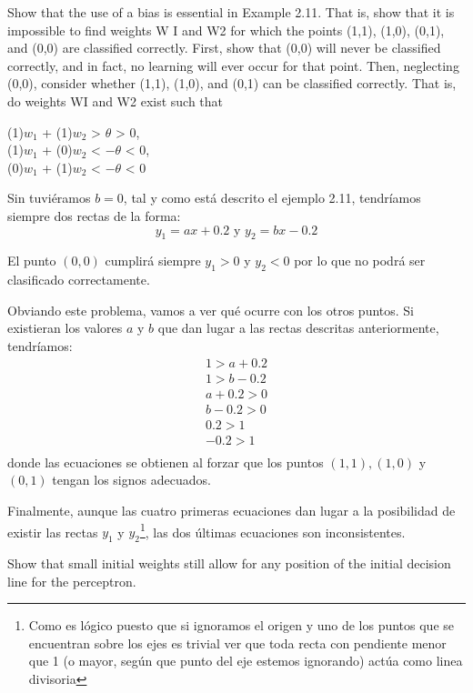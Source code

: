 \begin{problem}[9]
 Show that the use of a bias is essential in Example 2.11. That is, show that it is
impossible to find weights W I and W2 for which the points (1,1), (1,0), (0,1), and (0,0)
are classified correctly. First, show that (0,0) will never be classified correctly, and
in fact, no learning will ever occur for that point. Then, neglecting (0,0), consider
whether (1,1), (1,0), and (0,1) can be classified correctly. That is, do weights WI and
W2 exist such that
\begin{center}
(1)$w_1$ + (1)$w_2$ > $\theta $ > 0,\\
(1)$w_1$ + (0)$w_2$ < $-\theta $ < 0,\\
(0)$w_1$ + (1)$w_2$ < $-\theta $ < 0
\end{center}
\solution

Sin tuviéramos $b=0$, tal y como está descrito el ejemplo 2.11, tendríamos siempre dos rectas de la forma:
\[y_1=ax+0.2 \text{ y } y_2 = bx - 0.2\]

El punto $(0,0)$ cumplirá siempre $y_1>0$ y $y_2<0$ por lo que no podrá ser clasificado correctamente.

Obviando este problema, vamos a ver qué ocurre con los otros puntos. Si existieran los valores $a$ y $b$ que dan lugar a las rectas descritas anteriormente, tendríamos:
\[\begin{array}{l}
1 > a+0.2 \\
1 > b-0.2 \\
a+0.2 > 0 \\
b-0.2 > 0 \\
0.2 > 1 \\
-0.2 > 1\\
\end{array}\]
donde las ecuaciones se obtienen al forzar que los puntos $(1,1), (1,0)$ y $(0,1)$ tengan los signos adecuados.

Finalmente, aunque las cuatro primeras ecuaciones dan lugar a la posibilidad de existir las rectas $y_1$ y $y_2$\footnote{Como es lógico puesto que si ignoramos el origen y uno de los puntos que se encuentran sobre los ejes es trivial ver que toda recta con pendiente menor que 1 (o mayor, según que punto del eje estemos ignorando) actúa como linea divisoria}, las dos últimas ecuaciones son inconsistentes.

\end{problem}

\begin{problem}[10]
Show that small initial weights still allow for any position of the initial decision line
for the perceptron.

\solution



\end{problem}

